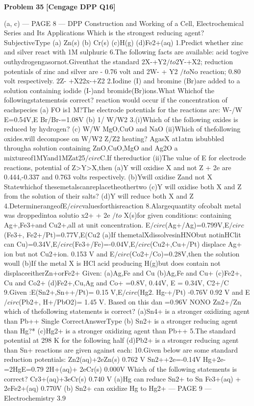 \begin{problembox}
\textbf{Problem 35} \hfill \textbf{[Cengage DPP Q16]}
\label{q:ext-cng_dpp_all_questions-35}

(a, c)
--- PAGE 8 ---
DPP
Construction and Working of a Cell, Electrochemical Series and
Its Applications
Which is the strongest reducing agent?
SubjectiveType
(a) Zn(s)
(b) Cr(s)
(c)H(g)
(d)Fe2+(aq)
1.Predict whether zinc and silver react with 1M sulphuric
6.The following facts are available:
acid togive outhydrogengasornot.Giventhat the standard
2X-+Y2$/to$2Y-+X2;
reduction potentials of zinc and silver are - 0.76 volt and
2W- + Y2 $/to$No reaction;
0.80 volt respectively.
2Z- +X22x-+Z2
2.Iodine (I) and bromine (Br)are added to a solution
containing iodide (I-)and bromide(Br)ions.What
Whichof the followingstatementsis correct?
reaction would occur if the concentration of eachspecies
(a)
FO
is1 M?The electrode potentials for the reactions are:
W-/W
E=0.54V,E
Br/Br-=1.08V
(b)
1/
W/W2
3.(i)Which of the following oxides is reduced by hydrogen?
(c)
W/W
MgO,CuO and NaO
(ii)Which of thefollowing oxides.will decompose on
W/W2
Z/Z2
heating?
AgasX at1atm isbubbled througha solution containing
ZnO,CuO,MgO and Ag2O
a mixtureof1MYand1MZat25$/circ$C.If thereductior
(ii)The value of E for electrode reactions,
potential of Z>Y>X,then
(a)Y will oxidise X and not Z
+ 2e are 0.444,-0.337 and 0.763 volts respectively.
(b)Ywill oxidise Zand not X
Statewhichof thesemetalscanreplacetheothertwo
(c)Y will oxidise both X and Z
from the solution of their salts?
(d)Y will reduce both X and Z
4.DeterminerangeofE$/circ$valuesforthisreaction
8.Alargequantity ofcobalt metal was droppedintoa solutio
x2+ + 2e $/to$ X(s)for given conditions:
containing Ag+,Fe3+and Cu$2$+,all at unit concentration.
E$/circ$(Ag+/Ag)=0.799V,E$/circ$(Fe3+, Fe2+/Pt)=0.77V,E(Cu$2$
(a)If themetalXdissolvesinHNObut notinHClit can
Cu)=0.34V,E$/circ$(Fe3+/Fe)=-0.04V,E$/circ$(Cu$2$+,Cu+/Pt)
displace Ag+ ion but not Cu2+ion.
0.153 V and E$/circ$(Co2+/Co)=0.28V,then the solution woull
(b)If the metal X is HCl acid producing H(g)but does
contain
not displaceeitherZn+orFe2+
Given:
(a)Ag,Fe and Cu
(b)Ag,Fe and Cu+
(c)Fe2+, Cu and Co2+
(d)Fe$2$+,Cu,Ag and Co+
=0.8V, 
0.44V, E
= 0.34V, 
C2+/C
9.Given :E(Sn$2$+,Sn++/Pt)= 0.15 V,E$/circ$(Hg$2$. Hg-+/Pt)
-0.76V
0.92 V and E$/circ$(Pb2+, H+/PbO2)= 1.45 V. Based on this dan
=0.96V
NONO
Zn$2$+/Zn
which of thefollowing statements is correct?
(a)Sn4+ is a stronger oxidizing agent than Pb++
Single CorrectAnswerType
(b) Sn2+ is a stronger reducing agent than Hg?*
(c)Hg2+ is a stronger oxidizing agent than Pb++
5.The standard potential at 298 K for the following half
(d)Pb2+ is a stronger reducing agent than Sn+
reactions are given against each:
10.Given below are some standard reduction potentials:
Zn$2$(aq)+2eZn(s)
0.762 V
Sn$2$++2e=-0.14V
Hg+2e-=2HgE=0.79
2H+(aq)+ 2eCr(s)
0.000V
Which of the following statements is correct?
Cr3+(aq)+3eCr(s)
0.740 V
(a)Hg can reduce Sn$2$+ to Sn
Fe3+(aq) + 2eFe2+(aq)
0.770V
(b) Sn2+ can oxidize Hg to Hg2+
--- PAGE 9 ---
Electrochemistry 3.9
\end{problembox}

